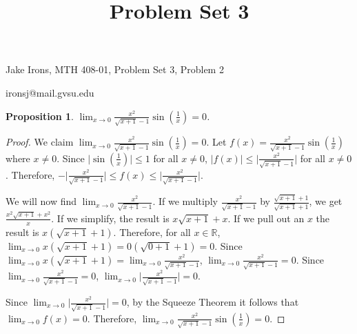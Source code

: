 \documentclass[11 pt]{article}
\title{Problem Set 3}
\newtheorem{proposition}{Proposition}
\newcommand{\newpar}{\vspace{.15in}\noindent}
\begin{document}
\noindent Jake Irons, MTH 408-01, Problem Set 3, Problem 2

\noindent ironsj@mail.gvsu.edu
\newpar
\begin{proposition}
$\displaystyle{\lim_{x \to 0}}\frac{x^2}{\sqrt{x+1}-1}\sin(\frac{1}{x})=0$.
\end{proposition}
\begin{proof}
We claim $\displaystyle{\lim_{x \to 0}}\frac{x^2}{\sqrt{x+1}-1}\sin(\frac{1}{x})=0$. Let $f(x)=\frac{x^2}{\sqrt{x+1}-1}\sin(\frac{1}{x})$ where $x\neq0$. Since $\lvert\sin(\frac{1}{x})\rvert\le1$ for all $x\neq0$, $\lvert f(x)\rvert\le\lvert\frac{x^2}{\sqrt{x+1}-1}\rvert$ for all $x\neq0$. Therefore, $-\lvert\frac{x^2}{\sqrt{x+1}-1}\rvert\le f(x)\le\lvert \frac{x^2}{\sqrt{x+1}-1}\rvert$.

\newpar
We will now find $\displaystyle{\lim_{x \to 0}}\frac{x^2}{\sqrt{x+1}-1}$. If we multiply $\frac{x^2}{\sqrt{x+1}-1}$ by $\frac{\sqrt{x+1}+1}{\sqrt{x+1}+1}$, we get $\frac{x^2\sqrt{x+1}+x^2}{x}$. If we simplify, the result is $x\sqrt{x+1}+x$. If we pull out an $x$ the result is $x(\sqrt{x+1}+1)$. Therefore, for all $x\in\mathbb{R}$, $\displaystyle{\lim_{x \to 0}}x(\sqrt{x+1}+1)=0(\sqrt{0+1}+1)=0$. Since $\displaystyle{\lim_{x \to 0}}x(\sqrt{x+1}+1)=\displaystyle{\lim_{x \to 0}}\frac{x^2}{\sqrt{x+1}-1}$, $\displaystyle{\lim_{x \to 0}}\frac{x^2}{\sqrt{x+1}-1}=0$. Since $\displaystyle{\lim_{x \to 0}}\frac{x^2}{\sqrt{x+1}-1}=0$, $\displaystyle{\lim_{x \to 0}}\lvert \frac{x^2}{\sqrt{x+1}-1}\rvert=0$.

\newpar
Since $\displaystyle{\lim_{x \to 0}}\lvert \frac{x^2}{\sqrt{x+1}-1}\rvert=0$, by the Squeeze Theorem it follows that $\displaystyle{\lim_{x \to 0}}f(x)=0$. Therefore, $\displaystyle{\lim_{x \to 0}}\frac{x^2}{\sqrt{x+1}-1}\sin(\frac{1}{x})=0$.



\end{proof}
\end{document}
